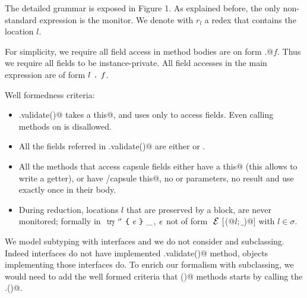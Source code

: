 The detailed grammar is exposed in Figure 1.
As explained before, the only non-standard expression is the monitor.
We denote with $r_l$ a redex that contains the location $l$.

For simplicity, we require all field access in method bodies are on form
\Q@this.@$f$. Thus we require all fields to be instance-private.
All field accesses in the main expression are of form $l{ \mbox{ {\texttt{.}} } }\mathit{f}$.

\noindent Well formedness criteria:
\begin{itemize}
\item \Q@.validate()@ takes a \Q@read this@, and uses \Q@this@ only to access fields. Even calling methods on \Q@this@
is disallowed.
\item All the fields referred in \Q@.validate()@ are either \Q@imm@ or \Q@capsule@.
\item All the methods that access capsule fields 
either have a \Q@read this@ (this allows to write a getter),
or have \Q@mut/capsule this@, no \Q@mut@ or \Q@read@ parameters, no \Q@mut@ result and 
use \Q@this@ exactly once in their body.
\item 
During reduction, locations $l$ that are preserved by a \Q@try@ block, are
never monitored; formally 
in $\Kw{try}^\sigma\oC\e\cC\_$, ${\mathit{e}}$ not of form $\ctx[$\Q@M(@$l;\_$\Q@)@$]$ with $l\in\sigma$.
\end{itemize}

We model subtyping with interfaces 
and we do not consider \Q@extends@ and subclassing.
Indeed interfaces do not have implemented \Q@.validate()@ method, objects implementing those interfaces do.
To enrich our formalism with subclassing, we would need to add the well 
formed criteria that \Q@validate()@ methods starts by calling the \Q@super@.\Q@validate()@.
\saveSpace
